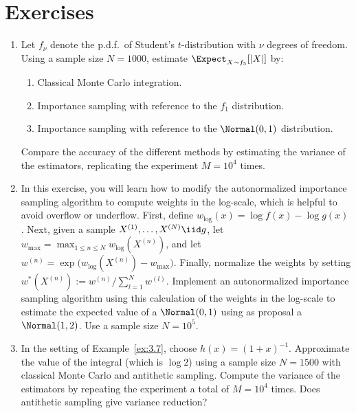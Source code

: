 
\section{Exercises}
\label{sec:3.5}

\begin{enumerate}

\item[3.1] Let $f_\nu$ denote the p.d.f.\ of Student's $t$-distribution with
$\nu$ degrees of freedom. Using a sample size $N = 1000$, estimate
$\Expect_{X \sim f_5}[|X|]$ by:
\begin{enumerate}
  \item[(a)] Classical Monte Carlo integration.
  \item[(b)] Importance sampling with reference to the $f_1$ distribution.
  \item[(c)] Importance sampling with reference to the $\Normal(0,1)$
             distribution.
\end{enumerate}
Compare the accuracy of the different methods by estimating the variance of the
estimators, replicating the experiment $M = 10^4$ times.

\item[3.2] In this exercise, you will learn how to modify the autonormalized
importance sampling algorithm to compute weights in the log-scale, which is
helpful to avoid overflow or underflow. First, define
$w_{\log}(x) = \log f(x) - \log g(x)$. Next, given a sample
$X^{(1)}, \ldots, X^{(N)} \iid g$, let
$w_{\max} = \max_{1 \leq n \leq N} w_{\log}(X^{(n)})$, and let
$w^{(n)} = \exp\!\bigl(w_{\log}(X^{(n)}) - w_{\max}\bigr)$. Finally, normalize
the weights by setting
$w^*(X^{(n)}) := w^{(n)} / \sum_{l=1}^{N} w^{(l)}$. Implement an
autonormalized importance sampling algorithm using this calculation of the
weights in the log-scale to estimate the expected value of a $\Normal(0,1)$
using as proposal a $\Normal(1,2)$. Use a sample size $N = 10^5$.

\item[3.3] In the setting of Example~\ref{ex:3.7}, choose $h(x) = (1+x)^{-1}$.
Approximate the value of the integral (which is $\log 2$) using a sample size
$N = 1500$ with classical Monte Carlo and antithetic sampling. Compute the
variance of the estimators by repeating the experiment a total of $M = 10^4$
times. Does antithetic sampling give variance reduction?


\end{enumerate}
